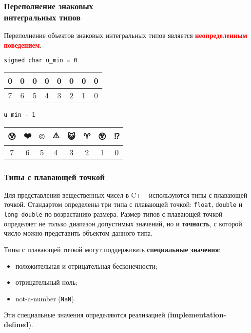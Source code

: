 \documentclass[compress, 8pt]{beamer}
\newenvironment{eightbit}{%
    \begin{center}
        \begin{tabular}{ |m{0.2cm}|m{0.2cm}|m{0.2cm}|m{0.2cm}|m{0.2cm}|m{0.2cm}|m{0.2cm}|m{0.2cm}|  }
            \hline
}{
        \hline
        \multicolumn{1}{c}{\color{gray}\tiny{7}} &
        \multicolumn{1}{c}{\color{gray}\tiny{6}} &
        \multicolumn{1}{c}{\color{gray}\tiny{5}} &
        \multicolumn{1}{c}{\color{gray}\tiny{4}} &
        \multicolumn{1}{c}{\color{gray}\tiny{3}} &
        \multicolumn{1}{c}{\color{gray}\tiny{2}} &
        \multicolumn{1}{c}{\color{gray}\tiny{1}} &
        \multicolumn{1}{c}{\color{gray}\tiny{0}} \\
        \end{tabular}
    \end{center}
}
\begin{document}
\begin{frame}[fragile]

    \frametitle{Переполнение знаковых \\ интегральных типов}

    Переполнение объектов знаковых интегральных типов является
    \textcolor{red}{\textbf{неопределенным поведением}}.

    \hfill \break

    \verb|signed char u_min = 0|

    \begin{eightbit}
        0 & 0 & 0 & 0 & 0 & 0 & 0 & 0 \\
    \end{eightbit}

    \verb|u_min - 1|

    \begin{eightbit}
         😰 & ❤️ & ©️ & ⚠️ & 😺 & ♈️ & 😵 & ⁉️ \\
    \end{eightbit}

\end{frame}

\begin{frame}[fragile]

    \frametitle{Типы с плавающей точкой}

    Для представления вещественных чисел в C++ используются
    типы с плавающей точкой.
    Стандартом определены три типа с плавающей точкой:
    \verb|float|, \verb|double| и \verb|long double|
    по возрастанию размера.
    Размер типов с плавающей точкой определяет не только
    диапазон допустимых значений, но и \textbf{точность},
    с которой число можно представить объектом данного
    типа.

    \hfill\break
    Типы с плавающей точкой могут поддерживать
    \textbf{специальные значения}:

    \begin{itemize}

        \item положительная и отрицательная бесконечности;

        \item отрицательный ноль;

        \item not-a-number (\verb|NaN|).

    \end{itemize}

    Эти специальные значения определяются реализацией
    (\textbf{implementation-defined}).

\end{frame}
\end{document}

